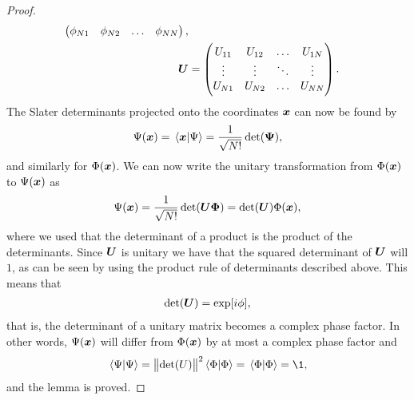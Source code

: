 \begin{proof}
\begin{align}
\begin{pmatrix}
                    \phi_{N1} & \phi_{N2} & \dots & \phi_{NN}
                \end{pmatrix}, \\
                \boldsymbol{U}
                &= \begin{pmatrix}
                    U_{11} & U_{12} & \dots & U_{1N} \\
                    \vdots & \vdots & \ddots & \vdots \\
                    U_{N1} & U_{N2} & \dots & U_{NN}
                \end{pmatrix}.
            \end{align}
            The Slater determinants projected onto the coordinates $\boldsymbol{x}$
            can now be found by
            \begin{align}
                \Psi(\boldsymbol{x})
                = \braket*{\boldsymbol{x}}{\Psi}
                = \frac{1}{\sqrt{N!}}\det(\boldsymbol{\Psi}),
            \end{align}
            and similarly for $\Phi(\boldsymbol{x})$.
            We can now write the unitary transformation from $\Phi(\boldsymbol{x})$
            to $\Psi(\boldsymbol{x})$ as
            \begin{align}
                \Psi(\boldsymbol{x})
                = \frac{1}{\sqrt{N!}}
                \det(\boldsymbol{U}\boldsymbol{\Phi})
                = \det(\boldsymbol{U})\Phi(\boldsymbol{x}),
            \end{align}
            where we used that the determinant of a product is the product
            of the determinants.
            Since $\boldsymbol{U}$ is unitary we have that the squared determinant
            of $\boldsymbol{U}$ will $1$, as can be seen by using the product rule
            of determinants described above.
            This means that
            \begin{align}
                \det(\boldsymbol{U}) = \exp[i\phi],
            \end{align}
            that is, the determinant of a unitary matrix becomes a complex
            phase factor.
            In other words, $\Psi(\boldsymbol{x})$ will differ from $\Phi(\boldsymbol{x})$
            by at most a complex phase factor and
            \begin{align}
                \braket*{\Psi}
                = \norm{\det(U)}^2\braket*{\Phi}
                = \braket*{\Phi}
                = \1,
            \end{align}
            and the lemma is proved.
        \end{proof}



